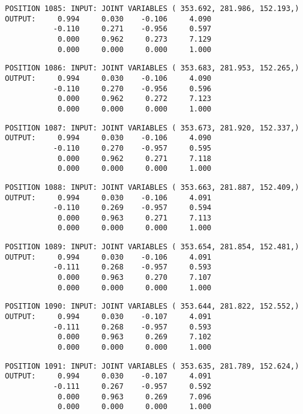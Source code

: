 \begin{verbatim}
POSITION 1085: INPUT: JOINT VARIABLES ( 353.692, 281.986, 152.193,)
OUTPUT:     0.994     0.030    -0.106     4.090
           -0.110     0.271    -0.956     0.597
            0.000     0.962     0.273     7.129
            0.000     0.000     0.000     1.000
\end{verbatim} \pagebreak[1]\begin{verbatim}
POSITION 1086: INPUT: JOINT VARIABLES ( 353.683, 281.953, 152.265,)
OUTPUT:     0.994     0.030    -0.106     4.090
           -0.110     0.270    -0.956     0.596
            0.000     0.962     0.272     7.123
            0.000     0.000     0.000     1.000
\end{verbatim} \pagebreak[1]\begin{verbatim}
POSITION 1087: INPUT: JOINT VARIABLES ( 353.673, 281.920, 152.337,)
OUTPUT:     0.994     0.030    -0.106     4.090
           -0.110     0.270    -0.957     0.595
            0.000     0.962     0.271     7.118
            0.000     0.000     0.000     1.000
\end{verbatim} \pagebreak[1]\begin{verbatim}
POSITION 1088: INPUT: JOINT VARIABLES ( 353.663, 281.887, 152.409,)
OUTPUT:     0.994     0.030    -0.106     4.091
           -0.110     0.269    -0.957     0.594
            0.000     0.963     0.271     7.113
            0.000     0.000     0.000     1.000
\end{verbatim} \pagebreak[1]\begin{verbatim}
POSITION 1089: INPUT: JOINT VARIABLES ( 353.654, 281.854, 152.481,)
OUTPUT:     0.994     0.030    -0.106     4.091
           -0.111     0.268    -0.957     0.593
            0.000     0.963     0.270     7.107
            0.000     0.000     0.000     1.000
\end{verbatim} \pagebreak[1]\begin{verbatim}
POSITION 1090: INPUT: JOINT VARIABLES ( 353.644, 281.822, 152.552,)
OUTPUT:     0.994     0.030    -0.107     4.091
           -0.111     0.268    -0.957     0.593
            0.000     0.963     0.269     7.102
            0.000     0.000     0.000     1.000
\end{verbatim} \pagebreak[1]\begin{verbatim}
POSITION 1091: INPUT: JOINT VARIABLES ( 353.635, 281.789, 152.624,)
OUTPUT:     0.994     0.030    -0.107     4.091
           -0.111     0.267    -0.957     0.592
            0.000     0.963     0.269     7.096
            0.000     0.000     0.000     1.000
\end{verbatim} \pagebreak[1]\begin{verbatim}

\end{verbatim}
